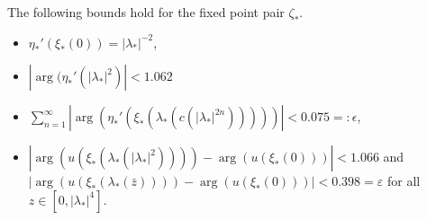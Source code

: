 \begin{lemma}\label{lem:conebounds}
The following bounds hold for the fixed point pair $\zeta_*$.
\begin{itemize}
\item[$1)$] $\eta_*'(\xi_*(0))=|\lambda_*|^{-2}$,
\item[$2)$] $|\arg(\eta_*'(|\lambda_*|^2)| <1.062$
\item[$3)$] $\sum_{n=1}^\infty |\arg(\eta_*'(\xi_*(\lambda_*(c(|\lambda_*|^{2n} )))))|<0.075=:\epsilon$,
\item[$4)$]  $| \arg(u(\xi_*(\lambda_*(|\lambda_*|^2))))-\arg(u(\xi_*(0)))   |<1.066$ and \\
$| \arg(u(\xi_*(\lambda_*(\bar{z}))))-\arg(u(\xi_*(0)))   |<0.398=\varepsilon$ for all $z \in [0,|\lambda_*|^4]$.
\end{itemize}
\end{lemma}
